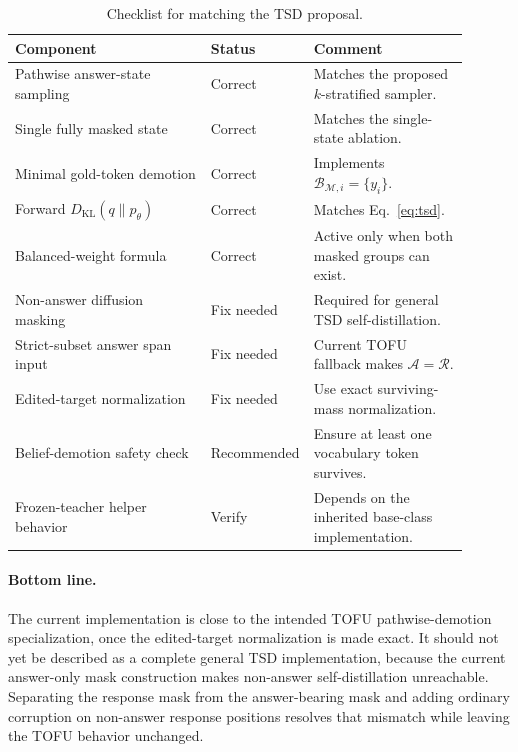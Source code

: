 \documentclass{article}
\newcommand{\Mset}{\mathcal{M}}
\newcommand{\Aset}{\mathcal{A}}
\newcommand{\KL}{D_{\mathrm{KL}}}
\begin{document}
\begin{table}[t]
\centering
\caption{Checklist for matching the TSD proposal.}
\label{tab:implementation-checklist}
\small
\setlength{\tabcolsep}{5pt}
\renewcommand{\arraystretch}{1.15}
\begin{tabular}{>{\raggedright\arraybackslash}p{0.43\linewidth}
                >{\centering\arraybackslash}p{0.13\linewidth}
                >{\raggedright\arraybackslash}p{0.34\linewidth}}
\toprule
\textbf{Component} & \textbf{Status} & \textbf{Comment} \\
\midrule
Pathwise answer-state sampling & Correct & Matches the proposed $k$-stratified sampler. \\
Single fully masked state & Correct & Matches the single-state ablation. \\
Minimal gold-token demotion & Correct & Implements $\mathcal{B}_{\Mset,i}=\{y_i\}$. \\
Forward $\KL(q\|p_\theta)$ & Correct & Matches Eq.~\eqref{eq:tsd}. \\
Balanced-weight formula & Correct & Active only when both masked groups can exist. \\
Non-answer diffusion masking & Fix needed & Required for general TSD self-distillation. \\
Strict-subset answer span input & Fix needed & Current TOFU fallback makes $\Aset=\mathcal{R}$. \\
Edited-target normalization & Fix needed & Use exact surviving-mass normalization. \\
Belief-demotion safety check & Recommended & Ensure at least one vocabulary token survives. \\
Frozen-teacher helper behavior & Verify & Depends on the inherited base-class implementation. \\
\bottomrule
\end{tabular}
\end{table}

\paragraph{Bottom line.}
The current implementation is close to the intended TOFU pathwise-demotion
specialization, once the edited-target normalization is made exact.  It should
not yet be described as a complete general TSD implementation, because the
current answer-only mask construction makes non-answer self-distillation
unreachable.  Separating the response mask from the answer-bearing mask and
adding ordinary corruption on non-answer response positions resolves that
mismatch while leaving the TOFU behavior unchanged.
\end{document}
